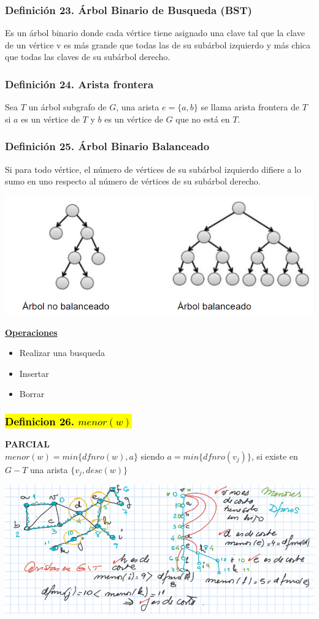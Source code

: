 \documentclass{article}
\newcommand{\bld}[1]{\textbf{#1}}
\begin{document}
\subsubsection*{Definición 23. Árbol Binario de Busqueda (BST)}
Es un árbol binario donde cada vértice tiene asignado una clave tal que la clave de un vértice v es más grande que
todas las de su subárbol izquierdo y más chica que todas las claves de su subárbol derecho.

\subsubsection*{Definición 24. Arista frontera}
Sea $T$ un árbol subgrafo de $G$, una arista $e=\{a,b\}$ se llama arista
frontera de $T$ si $a$ es un vértice de $T$ y $b$ es un vértice de $G$ que no está en $T$.

\subsubsection*{Definición 25. Árbol Binario Balanceado}
Si para todo vértice, el número de vértices de su subárbol izquierdo difiere a lo sumo en uno respecto al número de vértices
de su subárbol derecho.
\begin{center}
    \includegraphics[width=.50\textwidth]{arbolesBalanceados.PNG}
\end{center}
\underline{\bld{Operaciones}}
\begin{itemize}
    \item Realizar una busqueda
    \item Insertar
    \item Borrar
\end{itemize}

\subsubsection*{\hl{Definicion 26. $menor(w)$}}
\bld{PARCIAL}
\\$menor(w) = min\{dfnro(w), a\}$ siendo $a = min\{dfnro(v_j)\}$, si existe en $G-T$ una arista $\{v_j, desc(w)\}$
    \begin{center}
        \includegraphics[width=.80\textwidth]{menor(w).PNG}
    \end{center}
\end{document}
